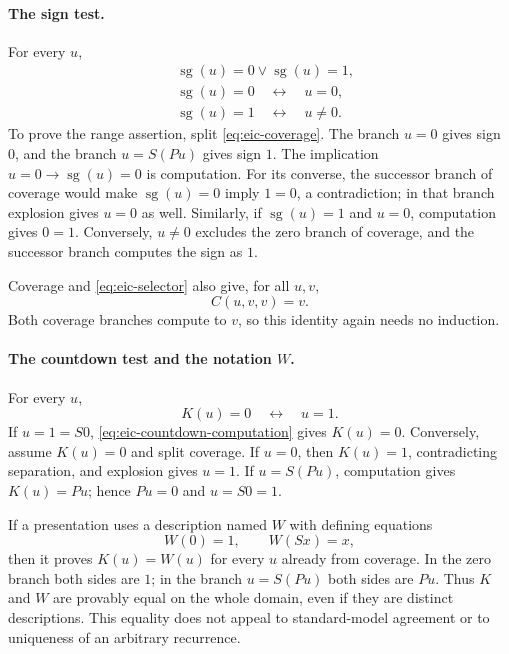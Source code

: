 \documentclass[11pt,letterpaper]{article}
\theoremstyle{definition}\newtheorem{definition}[theorem]{Definition}
\theoremstyle{remark}\newtheorem{remark}[theorem]{Remark}
\begin{document}
\paragraph{The sign test.}
For every $u$,
\begin{align}
 &\operatorname{sg}(u)=0\lor\operatorname{sg}(u)=1,
       \label{eq:eic-sign-range}\\
 &\operatorname{sg}(u)=0\quad\longleftrightarrow\quad u=0,
       \label{eq:eic-sign-zero}\\
 &\operatorname{sg}(u)=1\quad\longleftrightarrow\quad u\ne0.
       \label{eq:eic-sign-one}
\end{align}
To prove the range assertion, split \eqref{eq:eic-coverage}.  The branch
$u=0$ gives sign $0$, and the branch $u=S(Pu)$ gives sign $1$.
The implication $u=0\to\operatorname{sg}(u)=0$ is computation.
For its converse, the successor branch of coverage would make
$\operatorname{sg}(u)=0$ imply $1=0$, a contradiction; in that branch
explosion gives $u=0$ as well.  Similarly, if
$\operatorname{sg}(u)=1$ and $u=0$, computation gives $0=1$.
Conversely, $u\ne0$ excludes the zero branch of coverage, and the
successor branch computes the sign as $1$.

Coverage and \eqref{eq:eic-selector} also give, for all $u,v$,
\begin{equation}
 C(u,v,v)=v.
 \label{eq:eic-selector-idempotence}
\end{equation}
Both coverage branches compute to $v$, so this identity again needs no
induction.

\paragraph{The countdown test and the notation $W$.}
For every $u$,
\begin{equation}
 K(u)=0\quad\longleftrightarrow\quad u=1.
 \label{eq:eic-countdown-zero}
\end{equation}
If $u=1=S0$, \eqref{eq:eic-countdown-computation} gives $K(u)=0$.
Conversely, assume $K(u)=0$ and split coverage.  If $u=0$, then
$K(u)=1$, contradicting separation, and explosion gives $u=1$.
If $u=S(Pu)$, computation gives $K(u)=Pu$; hence $Pu=0$ and
$u=S0=1$.

If a presentation uses a description named $W$ with defining equations
\[
 W(0)=1,\qquad W(Sx)=x,
\]
then it proves $K(u)=W(u)$ for every $u$ already from coverage.
In the zero branch both sides are $1$; in the branch $u=S(Pu)$ both
sides are $Pu$.  Thus $K$ and $W$ are provably equal on the whole domain,
even if they are distinct descriptions.  This equality does not appeal to
standard-model agreement or to uniqueness of an arbitrary recurrence.
\end{document}

